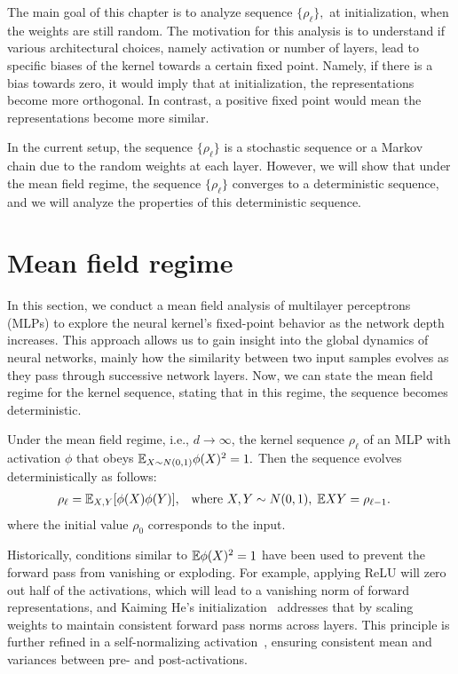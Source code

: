 The main goal of this chapter is to analyze sequence $\{\rho_\ell\},$ at initialization, when the weights are still random. The motivation for this analysis is to understand if various architectural choices, namely activation or number of layers, lead to specific biases of the kernel towards a certain fixed point. Namely, if there is a bias towards zero, it would imply that at initialization, the representations become more orthogonal. In contrast, a positive fixed point would mean the representations become more similar.

In the current setup, the sequence $\{\rho_\ell\}$ is a stochastic sequence or a Markov chain due to the random weights at each layer. 
However, we will show that under the mean field regime, the sequence $\{\rho_\ell\}$ converges to a deterministic sequence, and we will analyze the properties of this deterministic sequence.


\section{Mean field regime}

In this section, we conduct a mean field analysis of multilayer perceptrons (MLPs) to explore the neural kernel's fixed-point behavior as the network depth increases. This approach allows us to gain insight into the global dynamics of neural networks, mainly how the similarity between two input samples evolves as they pass through successive network layers.
Now, we can state the mean field regime for the kernel sequence, stating that in this regime, the sequence becomes deterministic.

\begin{proposition}
\label{iso:prop:mean_field_kernel}
Under the mean field regime, i.e., $d \to \infty$, the kernel sequence $\rho_\ell$ of an MLP with activation $\phi$ that obeys $\mathbb{E}_{X\sim N(0,1)} \phi(X)^2=1.$ Then the sequence evolves deterministically as follows:
\begin{align*}
&\rho_{\ell} = \mathbb{E}_{X,Y}[\phi(X)\phi(Y)], && 
\text{where } X, Y\sim N(0,1),\; \mathbb{E} XY = \rho_{\ell-1}.
\end{align*}
where the initial value $\rho_0$ corresponds to the input. 

\end{proposition}

Historically, conditions similar to $\mathbb{E} \phi(X)^2=1$ have been used to prevent the forward pass from vanishing or exploding. For example, applying ReLU will zero out half of the activations, which will lead to a vanishing norm of forward representations, and Kaiming He's initialization~\citet{he2016deep} addresses that by scaling weights to maintain consistent forward pass norms across layers. This principle is further refined in a self-normalizing activation~\citet{klambauer2017self}, ensuring consistent mean and variances between pre- and post-activations. 


